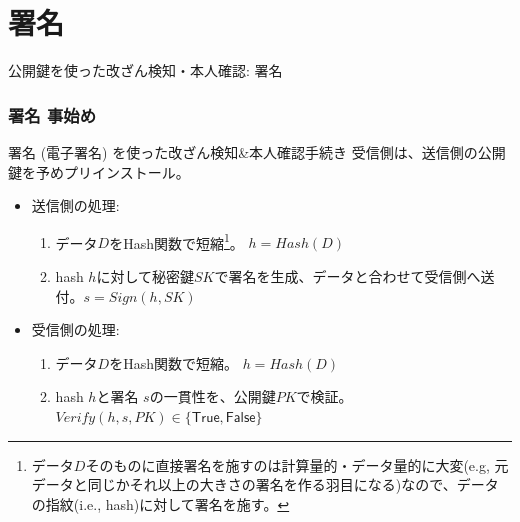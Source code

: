\documentclass[12pt,dvipdfmx]{beamer}
\begin{document}
\section{署名}
\begin{frame}
\centering
{\Large 公開鍵を使った改ざん検知・本人確認: 署名}

\end{frame}

\begin{frame}
\frametitle{署名 事始め}

\begin{block}{\small 署名 (電子署名) を使った改ざん検知\&本人確認手続き}
受信側は、送信側の公開鍵を予めプリインストール。
\begin{itemize}
 \item 送信側の処理:
\begin{enumerate}
 \item データ$D$をHash関数で短縮\footnote[frame]{\scriptsize データ$D$そのものに直接署名を施すのは計算量的・データ量的に大変(e.g, 元データと同じかそれ以上の大きさの署名を作る羽目になる)なので、\alert{データの指紋(i.e., hash)に対して署名を施す}。}。
$h = \mathit{Hash}(D)$
 \item hash $h$に対して秘密鍵$\mathit{SK}$で署名を生成、データと合わせて受信側へ送付。$s = \mathit{Sign}(h, \mathit{SK})$
\end{enumerate}
 \item 受信側の処理:
\begin{enumerate}
 \item データ$D$をHash関数で短縮。
$h = \mathit{Hash}(D)$
 \item hash $h$と署名 $s$の一貫性を、公開鍵$\mathit{PK}$で検証。$\mathit{Verify}(h, s, \mathit{PK}) \in \{\mathsf{True}, \mathsf{False}\}$
\end{enumerate}
\end{itemize}
\end{block}
\end{frame}
\end{document}
